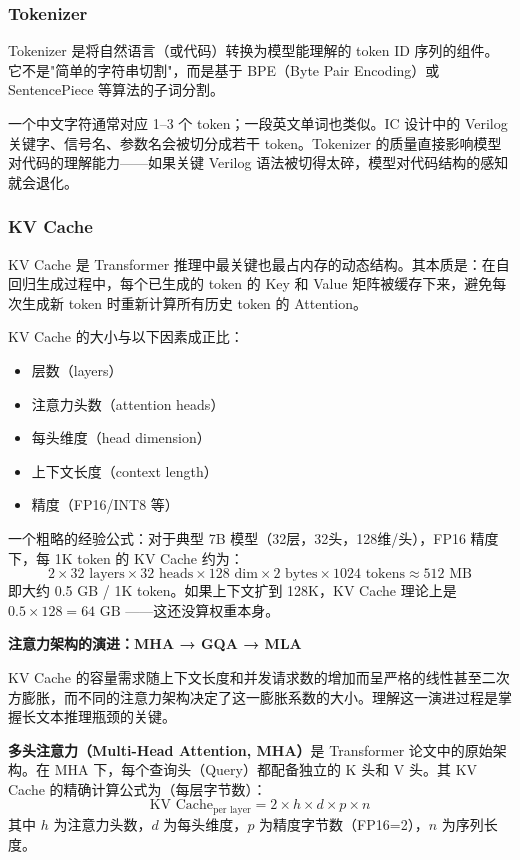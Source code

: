 \documentclass[UTF8,a4paper,10pt,oneside]{ctexart}
\begin{document}
\subsubsection{Tokenizer}

Tokenizer 是将自然语言（或代码）转换为模型能理解的 token ID 序列的组件。它不是"简单的字符串切割"，而是基于 BPE（Byte Pair Encoding）或 SentencePiece 等算法的子词分割。

一个中文字符通常对应 1--3 个 token；一段英文单词也类似。IC 设计中的 Verilog 关键字、信号名、参数名会被切分成若干 token。Tokenizer 的质量直接影响模型对代码的理解能力——如果关键 Verilog 语法被切得太碎，模型对代码结构的感知就会退化。

\subsubsection{KV Cache}

KV Cache 是 Transformer 推理中最关键也最占内存的动态结构。其本质是：在自回归生成过程中，每个已生成的 token 的 Key 和 Value 矩阵被缓存下来，避免每次生成新 token 时重新计算所有历史 token 的 Attention。

KV Cache 的大小与以下因素成正比：
\begin{itemize}
    \item 层数（layers）
    \item 注意力头数（attention heads）
    \item 每头维度（head dimension）
    \item 上下文长度（context length）
    \item 精度（FP16/INT8 等）
\end{itemize}

一个粗略的经验公式：对于典型 7B 模型（32层，32头，128维/头），FP16 精度下，每 1K token 的 KV Cache 约为：
\[
2 \times 32 \text{ layers} \times 32 \text{ heads} \times 128 \text{ dim} \times 2 \text{ bytes} \times 1024 \text{ tokens} \approx 512\text{ MB}
\]
即大约 0.5 GB / 1K token。如果上下文扩到 128K，KV Cache 理论上是 $0.5 \times 128 = 64\text{ GB}$ ——这还没算权重本身。

\textbf{注意力架构的演进：MHA → GQA → MLA}

KV Cache 的容量需求随上下文长度和并发请求数的增加而呈严格的线性甚至二次方膨胀，而不同的注意力架构决定了这一膨胀系数的大小。理解这一演进过程是掌握长文本推理瓶颈的关键。

\textbf{多头注意力（Multi-Head Attention, MHA）}是 Transformer 论文中的原始架构。在 MHA 下，每个查询头（Query）都配备独立的 K 头和 V 头。其 KV Cache 的精确计算公式为（每层字节数）：
\[
\text{KV Cache}_{\text{per layer}} = 2 \times h \times d \times p \times n
\]
其中 $h$ 为注意力头数，$d$ 为每头维度，$p$ 为精度字节数（FP16=2），$n$ 为序列长度。
\end{document}

